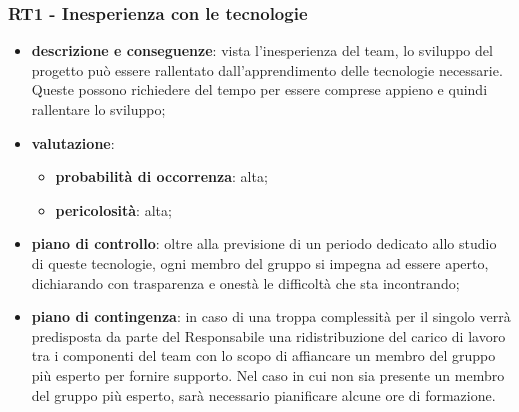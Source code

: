     \subsubsection{RT1 - Inesperienza con le tecnologie} \label{sec:RT1}
        \begin{itemize}
            \item \textbf{descrizione e conseguenze}: vista l'inesperienza del team, lo sviluppo del progetto può essere rallentato dall'apprendimento delle tecnologie necessarie. Queste possono richiedere del tempo per essere comprese appieno e quindi rallentare lo sviluppo;
            \item \textbf{valutazione}:
            \begin{itemize} 
                \item \textbf{probabilità di occorrenza}: alta;
                \item \textbf{pericolosità}: alta;
            \end{itemize}
            \item \textbf{piano di controllo}: oltre alla previsione di un periodo dedicato allo studio di queste tecnologie, ogni membro del gruppo si impegna ad essere aperto, dichiarando con trasparenza e onestà le difficoltà che sta incontrando;
            \item \textbf{piano di contingenza}: in caso di una troppa complessità per il singolo verrà predisposta da parte del Responsabile una ridistribuzione del carico di lavoro tra i componenti del team con lo scopo di affiancare un membro del gruppo più esperto per fornire supporto. Nel caso in cui non sia presente un membro del gruppo più esperto, sarà necessario pianificare alcune ore di formazione. 
        \end{itemize}
    
